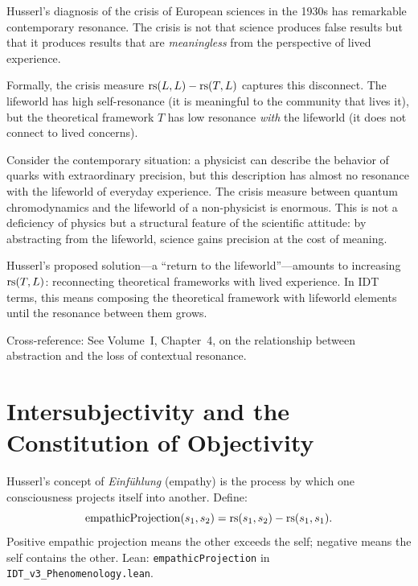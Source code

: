 \begin{interpretation}
\label{interp:husserl-crisis}
Husserl's diagnosis of the crisis of European sciences in the 1930s has
remarkable contemporary resonance.  The crisis is not that science produces
false results but that it produces results that are \emph{meaningless} from
the perspective of lived experience.

Formally, the crisis measure $\mathrm{rs}(L, L) - \mathrm{rs}(T, L)$ captures this
disconnect.  The lifeworld has high self-resonance (it is meaningful to the
community that lives it), but the theoretical framework $T$ has low resonance
\emph{with} the lifeworld (it does not connect to lived concerns).

Consider the contemporary situation: a physicist can describe the behavior
of quarks with extraordinary precision, but this description has almost no
resonance with the lifeworld of everyday experience.  The crisis measure
between quantum chromodynamics and the lifeworld of a non-physicist is
enormous.  This is not a deficiency of physics but a structural feature of
the scientific attitude: by abstracting from the lifeworld, science gains
precision at the cost of meaning.

Husserl's proposed solution---a ``return to the lifeworld''---amounts to
increasing $\mathrm{rs}(T, L)$: reconnecting theoretical frameworks with lived
experience.  In IDT terms, this means composing the theoretical framework
with lifeworld elements until the resonance between them grows.

Cross-reference: See Volume~I, Chapter~4, on the relationship between
abstraction and the loss of contextual resonance.
\end{interpretation}

\section{Intersubjectivity and the Constitution of Objectivity}

\begin{definition}
\label{def:empathic-projection}
Husserl's concept of \textit{Einf\"uhlung} (empathy) is the process by which
one consciousness projects itself into another.  Define:
\[
\mathrm{empathicProjection}(s_1, s_2) = \mathrm{rs}(s_1, s_2) - \mathrm{rs}(s_1, s_1).
\]
Positive empathic projection means the other exceeds the self; negative means
the self contains the other.
Lean: \texttt{empathicProjection} in \texttt{IDT\_v3\_Phenomenology.lean}.
\end{definition}

